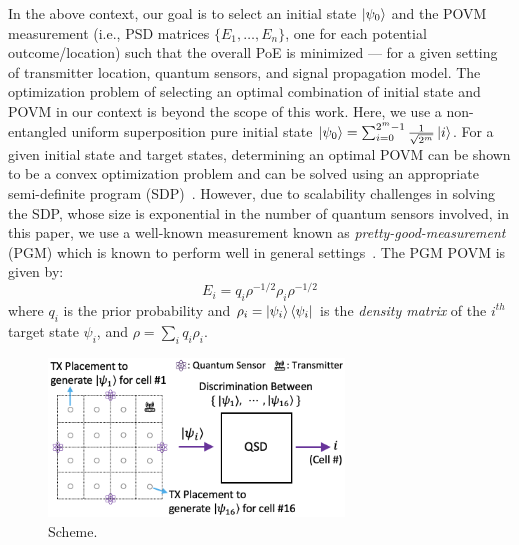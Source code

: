 In the above context, our goal is to select an initial state $\ket{\psi_0}$ and the 
POVM measurement (i.e., PSD matrices $\{E_1, \ldots, E_n\}$, one for each potential outcome/location) such that the overall  PoE is minimized --- for a given setting of transmitter location, quantum sensors, and signal propagation model.
The optimization problem of selecting an optimal combination of initial state and POVM
in our context is beyond the scope of this work. Here, we use a non-entangled uniform superposition
pure initial state $\ket{\psi_0} = \sum_{i=0}^{2^m-1} \frac{1}{\sqrt{2^m}} \ket{i} $. 
For a given initial state and target states, determining an optimal POVM can be shown to
be a convex optimization problem and can be solved using an appropriate semi-definite program (SDP)~\cite{semidefinite}. However, due to scalability challenges in solving the
SDP, whose size is exponential in the number of quantum sensors involved, 
in this paper, we use
a well-known measurement known as {\em pretty-good-measurement} (PGM) which is known to
perform well in general settings~\cite{prettygood}. The PGM POVM is given by: 
\begin{equation}
    E_i = q_i {\rho}^{-1/2} \rho_i {\rho}^{-1/2}
    \label{eqn:pgm}
\end{equation}
where $q_i$ is the prior probability and $\rho_i = \ket{\psi_i}\bra{\psi_i}$ is the {\em density matrix} of the $i^{th}$ target state $\psi_i$, and  $\rho = \sum_{i} q_i \rho_i$. 

\begin{figure}
    \centering
    \includegraphics[width=0.7\textwidth]{chapters/qce/figures/onelevel.png}
    \caption{\povmone Scheme.}
    \label{fig:onelevel}
\end{figure}



